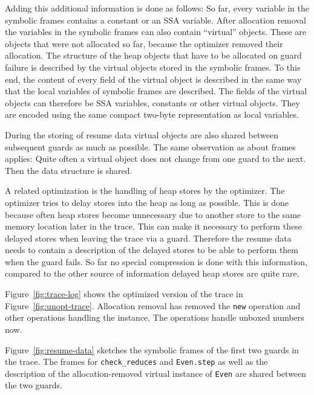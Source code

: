 \documentclass[10pt,preprint]{sigplanconf}
\begin{document}
Adding this additional information is done as follows:
So far, every variable in the symbolic frames
contains a constant or an SSA variable.
After allocation removal the variables in the symbolic frames can also contain
``virtual'' objects.
These are objects that were not allocated so far,
because the optimizer removed their allocation.
The structure of the heap objects that have to be allocated on guard failure
is described by the virtual objects stored in the symbolic frames.
To this end, the content of every field of the virtual object is described
in the same way that the local variables of symbolic frames are described.
The fields of the virtual objects can therefore be SSA variables, constants
or other virtual objects.
They are encoded using the same compact two-byte representation
as local variables.

During the storing of resume data virtual objects are also shared
between subsequent guards as much as possible.
The same observation as about frames applies:
Quite often a virtual object does not change from one guard to the next.
Then the data structure is shared.

A related optimization is the handling of heap stores by the optimizer.
The optimizer tries to delay stores into the heap as long as possible.
This is done because often heap stores become unnecessary
due to another store to the same memory location later in the trace.
This can make it necessary to perform these delayed stores
when leaving the trace via a guard.
Therefore the resume data needs to contain a description
of the delayed stores to be able to perform them when the guard fails.
So far no special compression is done with this information,
compared to the other source of information delayed heap stores are quite rare.

Figure~\ref{fig:trace-log} shows the optimized version of the trace in
Figure~\ref{fig:unopt-trace}. Allocation removal has removed the
\lstinline{new} operation and other operations handling the instance. The
operations handle unboxed numbers now.

Figure~\ref{fig:resume-data} sketches the symbolic frames of the first two
guards in the trace. The frames for \lstinline{check_reduces} and
\lstinline{Even.step} as well as the description of the allocation-removed
virtual instance of \lstinline{Even} are shared between the two guards.


\end{document}
